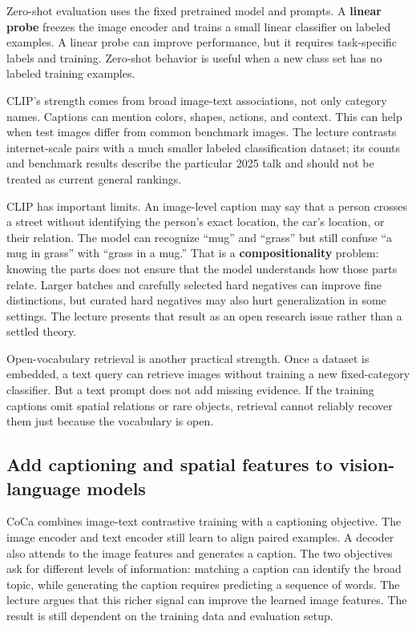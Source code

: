 Zero-shot evaluation uses the fixed pretrained model and prompts. A \textbf{linear probe} freezes the image encoder and trains a small linear classifier on labeled examples. A linear probe can improve performance, but it requires task-specific labels and training. Zero-shot behavior is useful when a new class set has no labeled training examples.

CLIP's strength comes from broad image-text associations, not only category names. Captions can mention colors, shapes, actions, and context. This can help when test images differ from common benchmark images. The lecture contrasts internet-scale pairs with a much smaller labeled classification dataset; its counts and benchmark results describe the particular 2025 talk and should not be treated as current general rankings.

CLIP has important limits. An image-level caption may say that a person crosses a street without identifying the person's exact location, the car's location, or their relation. The model can recognize ``mug'' and ``grass'' but still confuse ``a mug in grass'' with ``grass in a mug.'' That is a \textbf{compositionality} problem: knowing the parts does not ensure that the model understands how those parts relate. Larger batches and carefully selected hard negatives can improve fine distinctions, but curated hard negatives may also hurt generalization in some settings. The lecture presents that result as an open research issue rather than a settled theory.

Open-vocabulary retrieval is another practical strength. Once a dataset is embedded, a text query can retrieve images without training a new fixed-category classifier. But a text prompt does not add missing evidence. If the training captions omit spatial relations or rare objects, retrieval cannot reliably recover them just because the vocabulary is open.

\subsection{Add captioning and spatial features to vision-language models}\label{04-visual-computing-ii-ch031-add-captioning-and-spatial-features-to-vision-language-models}

\hypertarget{04-visual-computing-ii-ch031-add-captioning-and-spatial-features-to-vision-language-models}{}

CoCa combines image-text contrastive training with a captioning objective. The image encoder and text encoder still learn to align paired examples. A decoder also attends to the image features and generates a caption. The two objectives ask for different levels of information: matching a caption can identify the broad topic, while generating the caption requires predicting a sequence of words. The lecture argues that this richer signal can improve the learned image features. The result is still dependent on the training data and evaluation setup.

